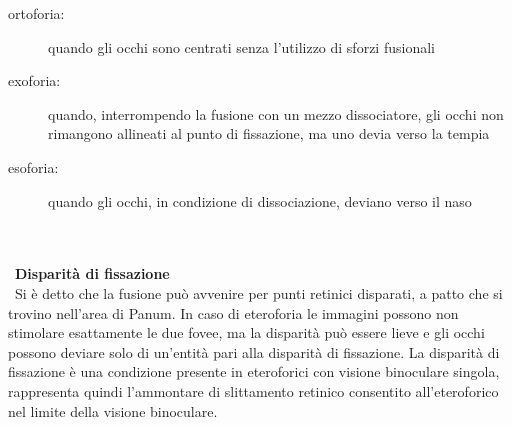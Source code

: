  \begin{description}
 \item[ortoforia:]quando gli occhi sono centrati senza l’utilizzo di sforzi fusionali
 \item[exoforia:]quando, interrompendo la fusione con un mezzo dissociatore, gli occhi non rimangono allineati al punto di fissazione, ma uno devia verso la tempia
 \item[esoforia:]quando gli occhi, in condizione di dissociazione, deviano verso il naso
\end{description}
\\\ \\\
\textbf{Disparità di fissazione}
\\\
Si è detto che la fusione può avvenire per punti retinici disparati, a patto che si trovino nell’area di Panum. In caso di eteroforia le immagini possono non stimolare esattamente le due fovee, ma la disparità può essere lieve e gli occhi possono deviare solo di un’entità pari alla disparità di fissazione. La disparità di fissazione è una condizione presente in eteroforici con visione binoculare singola, rappresenta quindi l’ammontare di slittamento retinico consentito all’eteroforico nel limite della visione binoculare.